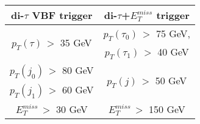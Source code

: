%
\renewcommand{\arraystretch}{1.2}
\begin{tabular}{cc}
\hline 
di-$\tau$ VBF trigger & di-$\tau$+$E_T^{miss}$ trigger\\ \hline \hline
\multirow{2}{*}{$p_T(\tau)\,>$ 35 GeV} & \multicolumn{1}{|c}{$p_T(\tau_0)\,>$ 75 GeV,}\\
& \multicolumn{1}{|c}{$p_T(\tau_1)\,>$ 40 GeV} \\ 
\multicolumn{1}{c|}{$p_T(j_0)\,>$ 80 GeV} & \multirow{2}{*}{$p_T(j)\,>$ 50 GeV}  \\
\multicolumn{1}{c|}{$p_T(j_1)\,>$ 60 GeV} &  \\ 
\multicolumn{1}{c|}{$E_T^{miss}\,>$ 30 GeV} & $E_T^{miss}\,>$ 150 GeV \\ 
\hline
\end{tabular}

%
%